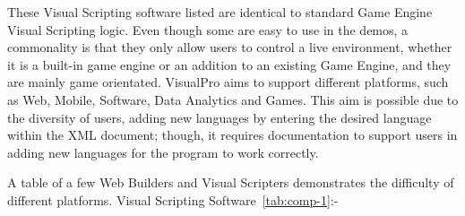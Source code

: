 \documentclass[12pt]{report} %
\begin{document}
		These Visual Scripting software listed are identical to standard Game Engine Visual Scripting logic. Even though some are easy to use in the demos, a commonality is that they only allow users to control a live environment, whether it is a built-in game engine or an addition to an existing Game Engine, and they are mainly game orientated. VisualPro aims to support different platforms, such as Web, Mobile, Software, Data Analytics and Games. This aim is possible due to the diversity of users, adding new languages by entering the desired language within the XML document; though, it requires documentation to support users in adding new languages for the program to work correctly.

		A table of a few Web Builders and Visual Scripters demonstrates the difficulty of different platforms. Visual Scripting Software~\ref{tab:comp-1}:-
\end{document}

